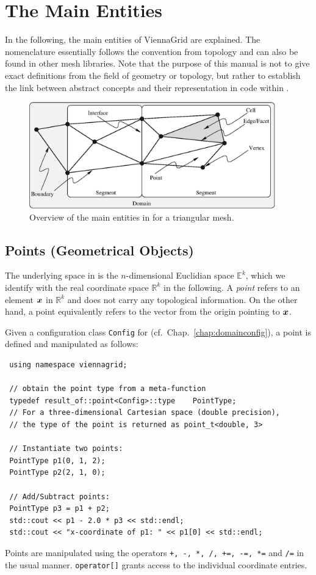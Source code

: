 \chapter{The Main Entities} \label{chap:entities}
In the following, the main entities of ViennaGrid are explained. The nomenclature essentially follows the convention from topology and can also be found in other mesh libraries. Note that the purpose of this manual is not to give exact definitions from the field of geometry or topology, but rather to establish the link between abstract concepts and their representation in code within {\ViennaGrid}.

\begin{figure}[tb]
\centering
 \includegraphics[width=0.95\textwidth]{figures/entities.eps}
 \caption{Overview of the main entities in {\ViennaGrid} for a triangular mesh.}
 \label{fig:entities}
\end{figure}


\section{Points (Geometrical Objects)}
The underlying space in {\ViennaGrid} is the $n$-dimensional Euclidian space $\mathbb{E}^k$, which we identify with the real coordinate space $\mathbb{R}^k$ in the following.
A \emph{point} refers to an element $\boldsymbol{x}$ in $\mathbb{R}^k$ and does not carry any topological information. On the other hand, a point equivalently refers to the vector from the origin pointing to $\boldsymbol{x}$.




Given a configuration class \lstinline|Config| for {\ViennaGrid} (cf.~Chap.~\ref{chap:domainconfig}), a point is defined and manipulated as follows:
\begin{lstlisting}
 using namespace viennagrid;

 // obtain the point type from a meta-function
 typedef result_of::point<Config>::type    PointType;
 // For a three-dimensional Cartesian space (double precision),
 // the type of the point is returned as point_t<double, 3>

 // Instantiate two points:
 PointType p1(0, 1, 2);
 PointType p2(2, 1, 0);

 // Add/Subtract points:
 PointType p3 = p1 + p2;
 std::cout << p1 - 2.0 * p3 << std::endl;
 std::cout << "x-coordinate of p1: " << p1[0] << std::endl;
\end{lstlisting}
Points are manipulated using the operators \lstinline|+, -, *, /, +=, -=, *=| and \lstinline|/=| in the usual manner. \lstinline|operator[]| grants access to the individual coordinate entries.

